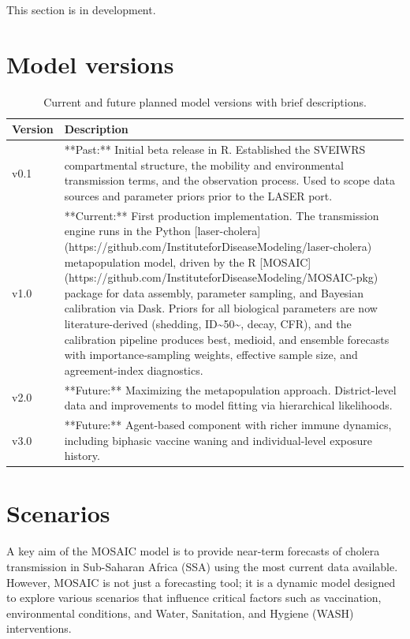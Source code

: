 \documentclass[
]{book}
\begin{document}
This section is in development.

\chapter{Model versions}\label{model-versions}

\begin{table}

\caption{\label{tab:unnamed-chunk-1}Current and future planned model versions with brief descriptions.}
\centering
\begin{tabular}[t]{l|l}
\hline
Version & Description\\
\hline
v0.1 & **Past:** Initial beta release in R. Established the SVEIWRS compartmental structure, the mobility and environmental transmission terms, and the observation process.  Used to scope data sources and parameter priors prior to the LASER port.\\
\hline
v1.0 & **Current:** First production implementation. The transmission engine runs in the Python [laser-cholera](https://github.com/InstituteforDiseaseModeling/laser-cholera) metapopulation model, driven by the R [MOSAIC](https://github.com/InstituteforDiseaseModeling/MOSAIC-pkg) package for data assembly, parameter sampling, and Bayesian calibration via Dask. Priors for all biological parameters are now literature-derived (shedding, ID\textasciitilde{}50\textasciitilde{}, decay, CFR), and the calibration pipeline produces best, medioid, and ensemble forecasts with importance-sampling weights, effective sample size, and agreement-index diagnostics.\\
\hline
v2.0 & **Future:** Maximizing the metapopulation approach. District-level data and improvements to model fitting via hierarchical likelihoods.\\
\hline
v3.0 & **Future:** Agent-based component with richer immune dynamics, including biphasic vaccine waning and individual-level exposure history.\\
\hline
\end{tabular}
\end{table}

\chapter{Scenarios}\label{scenarios}

A key aim of the MOSAIC model is to provide near-term forecasts of cholera transmission in Sub-Saharan Africa (SSA) using the most current data available. However, MOSAIC is not just a forecasting tool; it is a dynamic model designed to explore various scenarios that influence critical factors such as vaccination, environmental conditions, and Water, Sanitation, and Hygiene (WASH) interventions.
\end{document}
